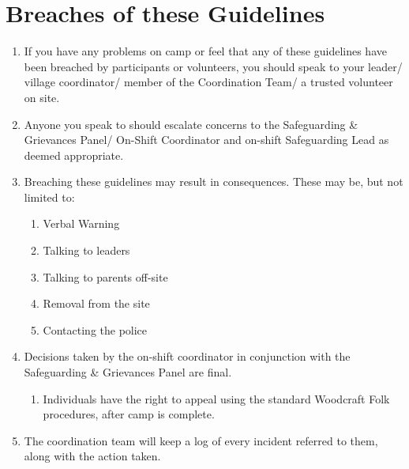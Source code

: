 \documentclass[a4paper, 11pt]{report}
\def\enumMarginIndentOne{4em}
\begin{document}
    \chapter{Breaches of these Guidelines}
    \begin{enumerate}
        \item If you have any problems on camp or feel that any of these guidelines have been breached by participants or volunteers, you should speak to your leader/ village coordinator/ member of the Coordination Team/ a trusted volunteer on site.
        \item Anyone you speak to should escalate concerns to the Safeguarding \& Grievances Panel/ On-Shift Coordinator and on-shift Safeguarding Lead as deemed appropriate.
        \item Breaching these guidelines may result in consequences. These may be, but not limited to:
        \begin{enumerate}[leftmargin=\enumMarginIndentOne]
            \item Verbal Warning
            \item Talking to leaders
            \item Talking to parents off-site
            \item Removal from the site
            \item Contacting the police
        \end{enumerate}
        \item Decisions taken by the on-shift coordinator in conjunction with the Safeguarding \& Grievances Panel are final.
        \begin{enumerate}[leftmargin=\enumMarginIndentOne]
            \item Individuals have the right to appeal using the standard Woodcraft Folk procedures, after camp is complete.
        \end{enumerate}
        \item The coordination team will keep a log of every incident referred to them, along with the action taken. 
    \end{enumerate}

    \backPage
\end{document}
